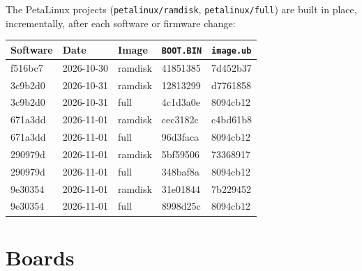 \documentclass[11pt]{article}
\newcommand{\h}[1]{\texttt{#1}}
\begin{document}
\noindent The PetaLinux projects (\h{petalinux/ramdisk}, \h{petalinux/full}) are built in place, incrementally,
after each software or firmware change:

\begin{center}
\begin{tabular}{@{}lllll@{}}
\toprule
Software & Date & Image & \h{BOOT.BIN} & \h{image.ub} \\
\midrule
f516bc7 & 2026-10-30 & ramdisk & 41851385 & 7d452b37 \\
3c9b2d0 & 2026-10-31 & ramdisk & 12813299 & d7761858 \\
3c9b2d0 & 2026-10-31 & full & 4c1d3a0e & 8094cb12 \\
671a3dd & 2026-11-01 & ramdisk & cec3182c & c4bd61b8 \\
671a3dd & 2026-11-01 & full & 96d3faca & 8094cb12 \\
290979d & 2026-11-01 & ramdisk & 5bf59506 & 73368917 \\
290979d & 2026-11-01 & full & 348baf8a & 8094cb12 \\
9e30354 & 2026-11-01 & ramdisk & 31e01844 & 7b229452 \\
9e30354 & 2026-11-01 & full & 8998d25c & 8094cb12 \\
\bottomrule
\end{tabular}
\end{center}

\section{Boards}
\end{document}
